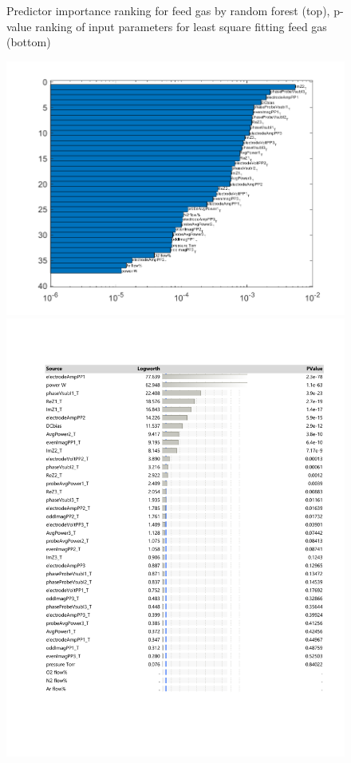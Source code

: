 \documentclass[12pt]{iopart}
\begin{document}
\begin{figure}[ht!]
\begin{center}
\caption{Predictor importance ranking for feed gas by random forest (top), p-value ranking of input parameters for least square fitting feed gas  (bottom) } 

\label{Fig:gap_SV,pressure_TB,species_TB}
\end{center}
\end{figure}

\begin{figure}[ht!]
\begin{center}
\begin{minipage}{0.5\textwidth}
    \includegraphics[width=1\textwidth]{input-importance-curvature-testGap.png}
\end{minipage}
\begin{minipage}{0.5\textwidth}
    \includegraphics[width=1\textwidth]{jmpGap.pdf}

\end{minipage}
\end{center}
\end{figure}
\end{document}
